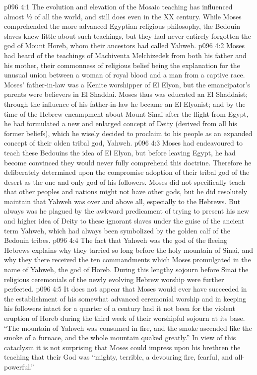 \vs p096 4:1 The evolution and elevation of the Mosaic teaching has influenced almost ½ of all the world, and still does even in the XX century. While Moses comprehended the more advanced Egyptian religious philosophy, the Bedouin slaves knew little about such teachings, but they had never entirely forgotten the god of Mount Horeb, whom their ancestors had called Yahweh.
\vs p096 4:2 Moses had heard of the teachings of Machiventa Melchizedek from both his father and his mother, their commonness of religious belief being the explanation for the unusual union between a woman of royal blood and a man from a captive race. Moses’ father\hyp{}in\hyp{}law was a Kenite worshipper of El Elyon, but the emancipator’s parents were believers in El Shaddai. Moses thus was educated an El Shaddaist; through the influence of his father\hyp{}in\hyp{}law he became an El Elyonist; and by the time of the Hebrew encampment about Mount Sinai after the flight from Egypt, he had formulated a new and enlarged concept of Deity (derived from all his former beliefs), which he wisely decided to proclaim to his people as an expanded concept of their olden tribal god, Yahweh.
\vs p096 4:3 Moses had endeavoured to teach these Bedouins the idea of El Elyon, but before leaving Egypt, he had become convinced they would never fully comprehend this doctrine. Therefore he deliberately determined upon the compromise adoption of their tribal god of the desert as the one and only god of his followers. Moses did not specifically teach that other peoples and nations might not have other gods, but he did resolutely maintain that Yahweh was over and above all, especially to the Hebrews. But always was he plagued by the awkward predicament of trying to present his new and higher idea of Deity to these ignorant slaves under the guise of the ancient term Yahweh, which had always been symbolized by the golden calf of the Bedouin tribes.
\vs p096 4:4 \pc The fact that Yahweh was the god of the fleeing Hebrews explains why they tarried so long before the holy mountain of Sinai, and why they there received the ten commandments which Moses promulgated in the name of Yahweh, the god of Horeb. During this lengthy sojourn before Sinai the religious ceremonials of the newly evolving Hebrew worship were further perfected.
\vs p096 4:5 \pc It does not appear that Moses would ever have succeeded in the establishment of his somewhat advanced ceremonial worship and in keeping his followers intact for a quarter of a century had it not been for the violent eruption of Horeb during the third week of their worshipful sojourn at its base. “The mountain of Yahweh was consumed in fire, and the smoke ascended like the smoke of a furnace, and the whole mountain quaked greatly.” In view of this cataclysm it is not surprising that Moses could impress upon his brethren the teaching that their God was “mighty, terrible, a devouring fire, fearful, and all\hyp{}powerful.”
